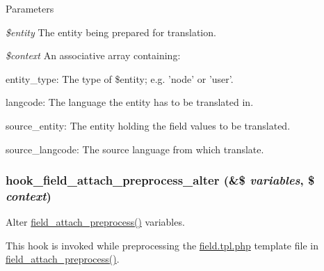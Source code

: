 \begin{DoxyParams}{Parameters}
\item[{\em \$entity}]The entity being prepared for translation. \item[{\em \$context}]An associative array containing:
\begin{DoxyItemize}
\item entity\_\-type: The type of \$entity; e.g. 'node' or 'user'.
\item langcode: The language the entity has to be translated in.
\item source\_\-entity: The entity holding the field values to be translated.
\item source\_\-langcode: The source language from which translate. 
\end{DoxyItemize}\end{DoxyParams}
\hypertarget{group__field__attach_ga0d592a702a05792a8549ae777db00792}{
\subsubsection[{hook\_\-field\_\-attach\_\-preprocess\_\-alter}]{\setlength{\rightskip}{0pt plus 5cm}hook\_\-field\_\-attach\_\-preprocess\_\-alter (\&\$ {\em variables}, \/  \$ {\em context})}}
\label{group__field__attach_ga0d592a702a05792a8549ae777db00792}
Alter \hyperlink{group__field__attach_ga46c512cf3ddf3937a78f9c7a0da4dce6}{field\_\-attach\_\-preprocess()} variables.

This hook is invoked while preprocessing the \hyperlink{field_8tpl_8php}{field.tpl.php} template file in \hyperlink{group__field__attach_ga46c512cf3ddf3937a78f9c7a0da4dce6}{field\_\-attach\_\-preprocess()}.


